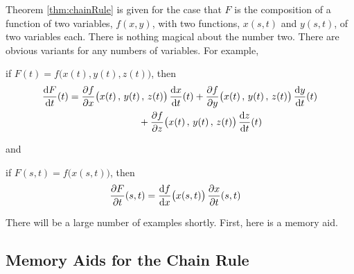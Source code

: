Theorem \ref{thm:chainRule} is given for the case that $F$ is the
composition of a function of two variables, $f(x,y)$, with two functions, 
$x(s,t)$ and $y(s,t)$,  of two variables each. There is nothing magical about 
the number two. There are obvious variants for any numbers of variables. 
For example,
\begin{impeqn}\label{eqn chain rule A}
if $F(t) = f\big(x(t),y(t),z(t)\big)$, then
\begin{align*}
\diff{F}{t}(t) &= \pdiff{f}{x}\big(x(t)\,,\,y(t)\,,\,z(t)\big)\, \diff{x}{t}(t)
           +\pdiff{f}{y}\big(x(t)\,,\,y(t)\,,\,z(t)\big)\, \diff{y}{t}(t) \\
     &\hskip1in   +\pdiff{f}{z}\big(x(t)\,,\,y(t)\,,\,z(t)\big)\, \diff{z}{t}(t)
\end{align*}

\end{impeqn}
and
\begin{impeqn}\label{eqn chain rule B}
if $F(s,t) = f\big(x(s,t)\big)$, then
\begin{align*}
\pdiff{F}{t}(s,t) &= \diff{f}{x}\big(x(s,t)\big)\, \pdiff{x}{t}(s,t)
\end{align*}

\end{impeqn}

There will be a large number of examples shortly. First, here is a
memory aid.

\subsection{Memory Aids for the Chain Rule}
\label{subsec memory aid}

